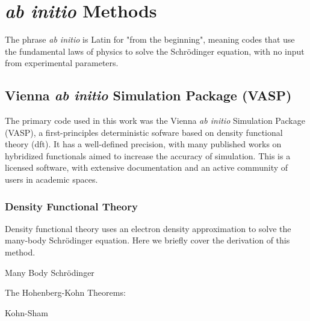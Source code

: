 \section{\textit{ab initio} Methods}

The phrase \textit{ab initio} is Latin for "from the beginning", meaning codes that use the fundamental laws of physics to solve the Schrödinger equation, with no input from experimental parameters. 

\subsection{Vienna \textit{ab initio} Simulation Package (VASP)}

The primary code used in this work was the Vienna \textit{ab initio} Simulation Package (VASP), a first-principles deterministic sofware based on density functional theory (dft). It has a well-defined precision, with many published works on hybridized functionals aimed to increase the accuracy of simulation. This is a licensed software, with extensive documentation and an active community of users in academic spaces. 

\subsubsection{Density Functional Theory}

Density functional theory uses an electron density approximation to solve the many-body Schrödinger equation. Here we briefly cover the derivation of this method.

Many Body Schrödinger
\autocite{schrodingerQuantisierungAlsEigenwertproblem1926} %
\autocite{ashcroftSolidStatePhysics1976} %

The Hohenberg-Kohn Theorems:
\autocite{hohenbergInhomogeneousElectronGas1964} %

Kohn-Sham
\autocite{kohnSelfConsistentEquationsIncluding1965} %

